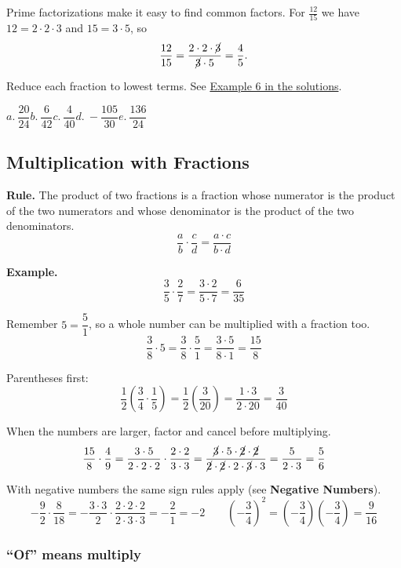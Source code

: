 \documentclass[letter]{article}
\newenvironment{keybox}
  {\begin{lrbox}{\keyboxsave}\begin{minipage}{\dimexpr\linewidth-2\fboxsep-2\fboxrule\relax}}
  {\end{minipage}\end{lrbox}\par\noindent\fbox{\usebox{\keyboxsave}}\par}
\newcommand{\exbox}[1]{\fbox{\textbf{Example #1}}}
\newcommand{\chp}{}
\newcommand{\seesol}[1]{See \hyperref[sec:\chp ex#1]{Example #1 in the solutions}.}
\begin{document}
Prime factorizations make it easy to find common factors. For $\frac{12}{15}$ we have $12=2\cdot2\cdot3$ and $15=3\cdot5$, so
\[
  \frac{12}{15}=\frac{2\cdot2\cdot\cancel{3}}{\cancel{3}\cdot5}=\frac45.
\]

\exbox{6} Reduce each fraction to lowest terms. \seesol{6}

\begin{center}
$a.\ \dfrac{20}{24}$\qquad $b.\ \dfrac6{42}$\qquad $c.\ \dfrac4{40}$\qquad $d.\ -\dfrac{105}{30}$\qquad $e.\ \dfrac{136}{24}$
\end{center}


\subsection{Multiplication with Fractions}

\begin{keybox}
\textbf{Rule.} The product of two fractions is a fraction whose numerator is the product of the two numerators and whose denominator is the product of the two denominators.
\[\frac ab\cdot\frac cd=\frac{a\cdot c}{b\cdot d}\]
\end{keybox}

\textbf{Example.}
\[\frac35\cdot\frac27=\frac{3\cdot2}{5\cdot7}=\frac6{35}\]

Remember $5=\dfrac51$, so a whole number can be multiplied with a fraction too.
\[\frac38\cdot5=\frac38\cdot\frac51=\frac{3\cdot5}{8\cdot1}=\frac{15}8\]

Parentheses first:
\[\frac12\left(\frac34\cdot\frac15\right)=\frac12\left(\frac3{20}\right)=\frac{1\cdot3}{2\cdot20}=\frac3{40}\]

When the numbers are larger, factor and cancel before multiplying.
\[
  \frac{15}8\cdot\frac49=\frac{3\cdot5}{2\cdot2\cdot2}\cdot\frac{2\cdot2}{3\cdot3}
  =\frac{\cancel3\cdot5\cdot\cancel2\cdot\cancel2}{\cancel2\cdot\cancel2\cdot2\cdot\cancel3\cdot3}=\frac5{2\cdot3}=\frac56
\]

With negative numbers the same sign rules apply (see \textbf{Negative Numbers}).
\[
  -\frac92\cdot\frac8{18}=-\frac{3\cdot3}{2}\cdot\frac{2\cdot2\cdot2}{2\cdot3\cdot3}=-\frac21=-2
\qquad
\left(-\frac34\right)^2=\left(-\frac34\right)\left(-\frac34\right)=\frac9{16}
\]

\subsubsection*{``Of'' means multiply}
\end{document}
